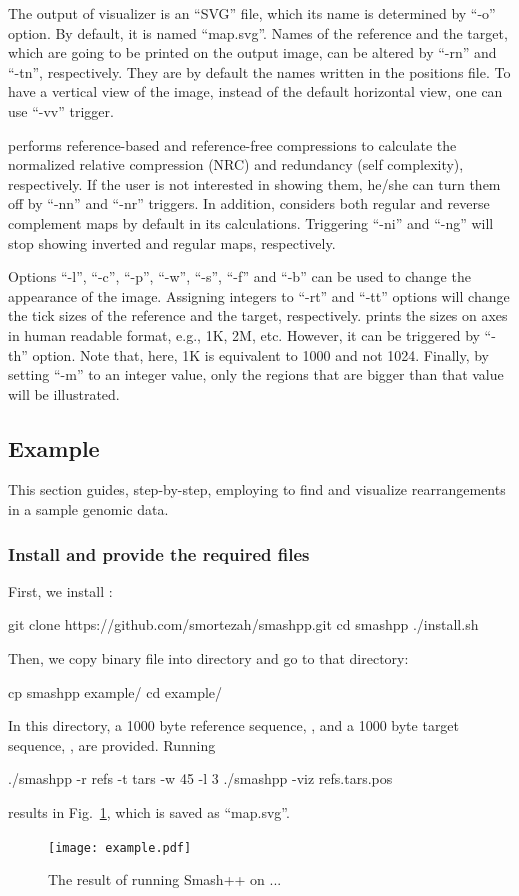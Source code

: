 The output of \smashpp visualizer is an ``SVG'' file, which its name is determined by ``-o'' option. By default, it is named ``map.svg''. Names of the reference and the target, which are going to be printed on the output image, can be altered by ``-rn'' and ``-tn'', respectively. They are by default the names written in the positions file. To have a vertical view of the image, instead of the default horizontal view, one can use ``-vv'' trigger.

\smashpp performs reference-based and reference-free compressions to calculate the normalized relative compression (NRC) and redundancy (self complexity), respectively. If the user is not interested in showing them, he/she can turn them off by ``-nn'' and ``-nr'' triggers. In addition, \smashpp considers both regular and reverse complement maps by default in its calculations. Triggering ``-ni'' and ``-ng'' will stop showing inverted and regular maps, respectively.

Options ``-l'', ``-c'', ``-p'', ``-w'', ``-s'', ``-f'' and ``-b'' can be used to change the appearance of the image. Assigning integers to ``-rt'' and ``-tt'' options will change the tick sizes of the reference and the target, respectively. \smashpp prints the sizes on axes in human readable format, e.g., 1K, 2M, etc. However, it can be triggered by ``-th'' option. Note that, here, 1K is equivalent to 1000 and not 1024. Finally, by setting ``-m'' to an integer value, only the regions that are bigger than that value will be illustrated.

\subsection{Example}
This section guides, step-by-step, employing \smashpp to find and visualize rearrangements in a sample genomic data.

\subsubsection*{Install \smashpp and provide the required files}
First, we install \smashpp:
\begin{code}[style=bash]
  git clone https://github.com/smortezah/smashpp.git
  cd smashpp
  ./install.sh
\end{code}
Then, we copy  binary file into  directory and go to that directory:
\begin{code}[style=bash]
  cp smashpp example/
  cd example/
\end{code}
In this directory, a 1000 byte reference sequence, , and a 1000 byte target sequence, , are provided. Running
\begin{code}[style=bash]
  ./smashpp -r refs -t tars -w 45 -l 3
  ./smashpp -viz refs.tars.pos
\end{code}
results in Fig.~\ref{fig.example}, which is saved as ``map.svg''.

\begin{figure}[!h]
  \texttt{[image: example.pdf]}
  \caption{The result of running Smash++ on ...}
  \label{fig.example}
\end{figure}